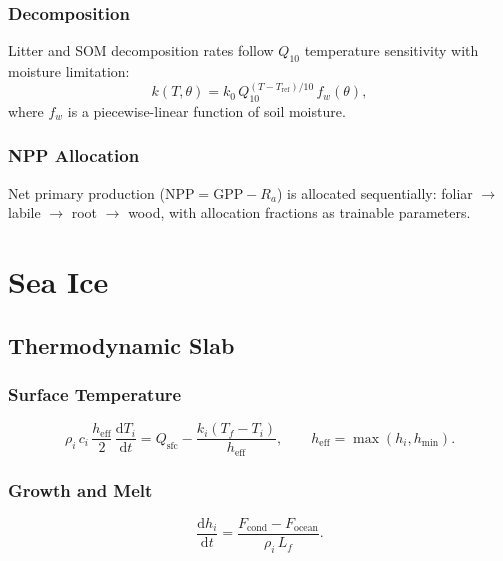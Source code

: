 \documentclass[11pt,twoside]{report}
\newcommand{\dd}{\mathrm{d}}
\newcommand{\Lf}{L_f}
\begin{document}
\subsection{Decomposition}

Litter and SOM decomposition rates follow $Q_{10}$ temperature sensitivity with moisture limitation:
\begin{equation}
  k(T,\theta) = k_0\,Q_{10}^{(T-T_{\mathrm{ref}})/10}\,f_w(\theta),
\end{equation}
where $f_w$ is a piecewise-linear function of soil moisture.

\subsection{NPP Allocation}

Net primary production ($\mathrm{NPP}=\mathrm{GPP}-R_a$) is allocated sequentially: foliar $\to$ labile $\to$ root $\to$ wood, with allocation fractions as trainable parameters.


\chapter{Sea Ice}
\label{ch:ice}

\section{Thermodynamic Slab}

\subsection{Surface Temperature}
\begin{equation}
  \rho_i\,c_i\,\frac{h_{\mathrm{eff}}}{2}\,\frac{\dd T_i}{\dd t}
  = Q_{\mathrm{sfc}} - \frac{k_i(T_f-T_i)}{h_{\mathrm{eff}}},
  \qquad h_{\mathrm{eff}}=\max(h_i,h_{\min}).
\end{equation}

\subsection{Growth and Melt}
\begin{equation}
  \frac{\dd h_i}{\dd t} = \frac{F_{\mathrm{cond}}-F_{\mathrm{ocean}}}
  {\rho_i\,\Lf}.
\end{equation}
\end{document}
